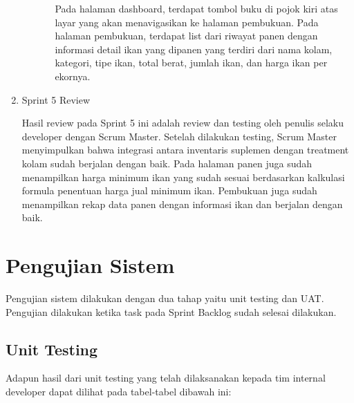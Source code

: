 \begin{spacing}{1.5}
\begin{enumerate}
\begin{enumerate}
\begin{itemize}
				Pada halaman dashboard, terdapat tombol buku di pojok kiri atas layar yang akan menavigasikan ke halaman pembukuan. Pada halaman pembukuan, terdapat list dari riwayat panen dengan informasi detail ikan yang dipanen yang terdiri dari nama kolam, kategori, tipe ikan, total berat, jumlah ikan, dan harga ikan per ekornya.
			\end{itemize}
		\end{enumerate}

		\item Sprint 5 Review
		
		Hasil review pada Sprint 5 ini adalah review dan testing oleh penulis selaku developer dengan Scrum Master. Setelah dilakukan testing, Scrum Master menyimpulkan bahwa integrasi antara inventaris suplemen dengan treatment kolam sudah berjalan dengan baik. Pada halaman panen juga sudah menampilkan harga minimum ikan yang sudah sesuai berdasarkan kalkulasi formula penentuan harga jual minimum ikan. Pembukuan juga sudah menampilkan rekap data panen dengan informasi ikan dan berjalan dengan baik.
 
	\end{enumerate}

\section{Pengujian Sistem}

Pengujian sistem dilakukan dengan dua tahap yaitu unit testing dan UAT. Pengujian dilakukan ketika task pada Sprint Backlog sudah selesai dilakukan.

\subsection{Unit Testing}

Adapun hasil dari unit testing yang telah dilaksanakan kepada tim internal developer dapat dilihat pada tabel-tabel dibawah ini:


\end{spacing}
